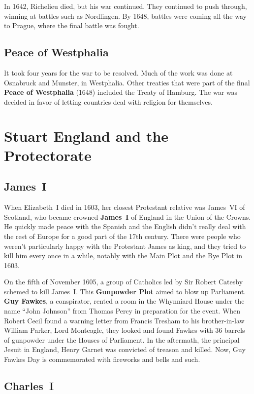 In 1642, Richelieu died, but his war continued.
They continued to push through, winning at battles such as Nordlingen.
By 1648, battles were coming all the way to Prague, where the final battle was fought.

\subsection*{Peace of Westphalia}

It took four years for the war to be resolved.
Much of the work was done at Osnabruck and Munster, in Westphalia.
Other treaties that were part of the final \textbf{Peace of Westphalia} (1648)
included the Treaty of Hamburg.
The war was decided in favor of letting countries deal with religion for themselves.

\section{Stuart England and the Protectorate}

\subsection*{James~I}

When Elizabeth~I died in 1603, her closest Protestant relative was
James~VI of Scotland, who became crowned \textbf{James~I} of England in the Union of the Crowns.
He quickly made peace with the Spanish
and the English didn't really deal with the rest of Europe for a good part of the 17th century.
There were people who weren't particularly happy with the Protestant James as king,
and they tried to kill him every once in a while, notably with the Main Plot and the Bye Plot in 1603.

On the fifth of November 1605, a group of Catholics led by Sir Robert Catesby schemed to kill James~I.
This \textbf{Gunpowder Plot} aimed to blow up Parliament.
\textbf{Guy Fawkes}, a conspirator, rented a room in the Whynniard House
under the name ``John Johnson'' from Thomas Percy in preparation for the event.
When Robert Cecil found a warning letter from Francis Tresham to his brother-in-law William Parker, Lord Monteagle,
they looked and found Fawkes with 36 barrels of gunpowder under the Houses of Parliament.
In the aftermath, the principal Jesuit in England, Henry Garnet was convicted of treason and killed.
Now, Guy Fawkes Day is commemorated with fireworks and bells and such.

\subsection*{Charles~I}

